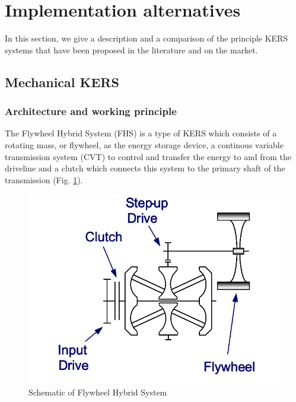 \documentclass[11pt]{article}
\begin{document}
\section{Implementation alternatives}

In this section, we give a description and a comparison of the principle KERS systems that have been proposed in the literature and on the market.

\subsection{Mechanical KERS}

\subsubsection{Architecture and working principle}

The Flywheel Hybrid System (FHS) is a type of KERS which consists of a rotating mass, or flywheel, as the energy storage device, a continous variable transmission system (CVT) to control and transfer the energy to and from the driveline and a clutch which connects this system to the primary shaft of the transmission (Fig. \ref{fig: FHS}). 

\begin{figure}[H]
\centering
\includegraphics[width=.6\textwidth]{Images/State_of_the_art/Mechanical_KERS.png}
\caption{Schematic of Flywheel Hybrid System}
\label{fig: FHS}
\end{figure}
\end{document}

